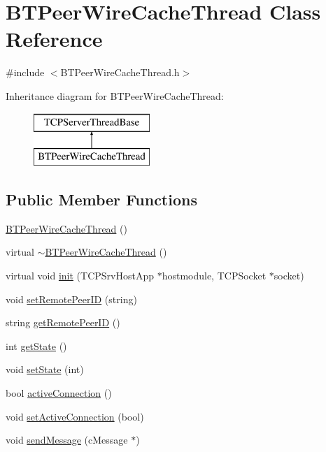 \hypertarget{classBTPeerWireCacheThread}{}\section{B\+T\+Peer\+Wire\+Cache\+Thread Class Reference}
\label{classBTPeerWireCacheThread}


{\ttfamily \#include $<$B\+T\+Peer\+Wire\+Cache\+Thread.\+h$>$}

Inheritance diagram for B\+T\+Peer\+Wire\+Cache\+Thread\+:\begin{figure}[H]
\begin{center}
\leavevmode
\includegraphics[height=2.000000cm]{classBTPeerWireCacheThread}
\end{center}
\end{figure}
\subsection*{Public Member Functions}
\begin{DoxyCompactItemize}
\item 
\hyperlink{classBTPeerWireCacheThread_a64d59956f320cd1f02a9cd25bb5a9b0e}{B\+T\+Peer\+Wire\+Cache\+Thread} ()
\item 
virtual \hyperlink{classBTPeerWireCacheThread_a53ff411ef0e4195e47a1243f8fbc5890}{$\sim$\+B\+T\+Peer\+Wire\+Cache\+Thread} ()
\item 
virtual void \hyperlink{classBTPeerWireCacheThread_ae2b849a82f1fbc804720d8dbd6a1da03}{init} (T\+C\+P\+Srv\+Host\+App $\ast$hostmodule, T\+C\+P\+Socket $\ast$socket)
\item 
void \hyperlink{classBTPeerWireCacheThread_a25c8569e9f081e494010b52ef49ffc28}{set\+Remote\+Peer\+I\+D} (string)
\item 
string \hyperlink{classBTPeerWireCacheThread_a73e132e3219c223e9a76807b8f690e1c}{get\+Remote\+Peer\+I\+D} ()
\item 
int \hyperlink{classBTPeerWireCacheThread_a1381df92c8aa197f77d2acdb427d9a5c}{get\+State} ()
\item 
void \hyperlink{classBTPeerWireCacheThread_a7011178cc92072e84e221fc9ce0a1b7e}{set\+State} (int)
\item 
bool \hyperlink{classBTPeerWireCacheThread_acaaeb8995d597ff9dacab531989ce7ab}{active\+Connection} ()
\item 
void \hyperlink{classBTPeerWireCacheThread_af3e0310651d1223378f3a80a13e981c9}{set\+Active\+Connection} (bool)
\item 
void \hyperlink{classBTPeerWireCacheThread_ab919706b39311ea8dff25267faa51e73}{send\+Message} (c\+Message $\ast$)
\end{DoxyCompactItemize}
